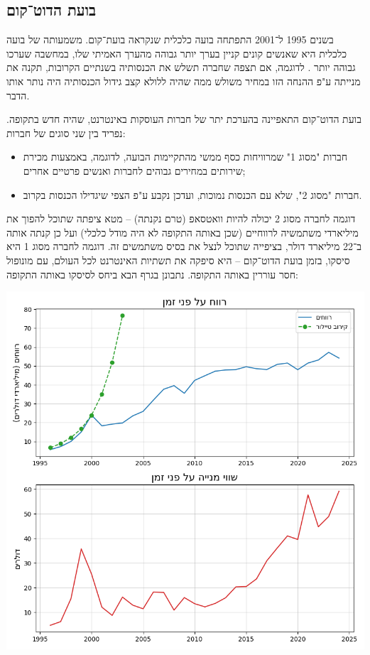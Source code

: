 \documentclass[]{article}
\theoremstyle{definition}
\begin{document}
	\subsection{בועת הדוט־קום}
	\begin{multicols}{2}
		בשנים 1995 ל־2001 התפתחה בועה כלכלית שנקראה בועת־קום. משמעותה של בועה כלכלית היא שאנשים קונים קניין בערך יותר גבוהה מהערך האמיתי שלו, במחשבה שערכו גבוהה יותר \cite{bubble}. לדוגמה, אם תצפה שחברה תשלש את הכנסותיה בשנתיים הקרובות, תקנה את מנייתה ע"פ ההנחה הזו במחיר משולש ממה שהיה ללולא קצב גידול הכנסותיה היה נותר אותו הדבר. 
		
		בועת הדוט־קום התאפיינה בהערכת יתר של חברות העוסקות באינטרנט, שהיה חדש בתקופה. נפריד בין שני סוגים של חברות: 
		\begin{itemize}
			\item חברות "מסוג 1" שמרוויחות כסף ממשי מהתקיימות הבועה, לדוגמה, באמצעות מכירת שירותים במחירים גבוהים לחברות ואנשים פרטיים אחרים;
			\item חברות "מסוג 2", שלא עם הכנסות נמוכות, ועדכן נקבע ע"פ הצפי שיגדילו הכנסות בקרוב. 
		\end{itemize}
		דוגמה לחברה מסוג 2 יכולה להיות וואטסאפ (טרם נקנתה) – מטא ציפתה שתוכל להפוך את מיליארדי משתמשיה לרווחיים (שכן באותה התקופה לא היה מודל כלכלי) ועל כן קנתה אותה ב־22 מיליארד דולר, בציפייה שתוכל לנצל את בסיס משתמשים זה. דוגמה לחברה מסוג 1 היא סיסקו, בזמן בועת הדוט־קום – היא סיפקה את תשתיות האינטרנט לכל העולם, עם מונופול חסר עוררין באותה התקופה. נתבונן בגרף הבא ביחס לסיסקו באותה התקופה:
		
		
		\begin{minipage}{\linewidth} 
			\centering
			\includegraphics[width=\linewidth]{../cisco_revenue/revenue+taylorapprox}
			\label{fig:input.eps}
		\end{minipage} 
		

\end{multicols}
\end{document}
